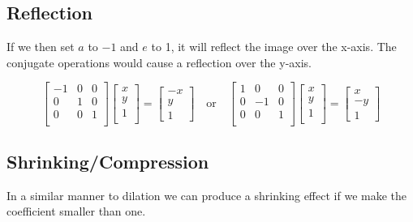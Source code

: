 \documentclass{article}
\begin{document}
\clearpage
\subsection{Reflection} 
If we then set $ a $ to $-1$ and $ e $ to 1, it will reflect the image over 
the x-axis. The conjugate operations would cause a reflection over the y-axis.

\[%
    \begin{bmatrix} 
        -1 & 0 & 0 \\
		0 & 1 & 0 \\
		0 & 0 & 1 \\		
    \end{bmatrix}
    \begin{bmatrix}
        x \\
        y \\
		1 \\		
    \end{bmatrix}
    =
    \begin{bmatrix} - x \\  y \\ 1 \end{bmatrix}
    \quad
    \text{or}
    \quad
    \begin{bmatrix} 
        1 & 0 & 0 \\
		0 & -1 & 0 \\
		0 & 0 & 1 \\		
    \end{bmatrix}
    \begin{bmatrix}
        x \\
        y \\
		1 \\		
    \end{bmatrix}
    =
    \begin{bmatrix} x \\ -y \\ 1 \end{bmatrix}
\]%

\begin{figure}[!htbp]
    \centering
\end{figure}


\subsection{Shrinking/Compression} 

In a similar manner to dilation we can produce a shrinking effect if we make the
coefficient smaller than one.
\end{document}
